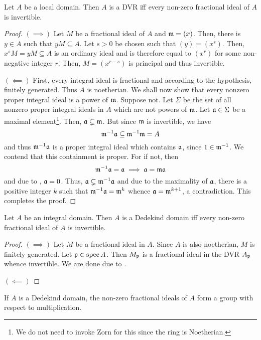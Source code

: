 \begin{proposition}
    Let $A$ be a local domain. Then $A$ is a DVR iff every non-zero fractional ideal of $A$ is invertible.
\end{proposition}
\begin{proof}
    $(\implies)$ Let $M$ be a fractional ideal of $A$ and $\mathfrak m = (x)$. Then, there is $y\in A$ such that $yM\subseteq A$. Let $s > 0$ be chosen such that $(y) = (x^s)$. Then, $x^sM = yM\subseteq A$ is an ordinary ideal and is therefore equal to $(x^r)$ for some non-negative integer $r$. Then, $M = (x^{r - s})$ is principal and thus invertible. 

    $(\impliedby)$ First, every integral ideal is fractional and according to the hypothesis, finitely generated. Thus $A$ is noetherian. We shall now show that every nonzero proper integral ideal is a power of $\mathfrak m$. Suppose not. Let $\Sigma$ be the set of all nonzero proper integral ideals in $A$ which are not powers of $\mathfrak m$. Let $\mathfrak a\in\Sigma$ be a maximal element\footnote{We do not need to invoke Zorn for this since the ring is Noetherian.}. Then, $\mathfrak a\subsetneq\mathfrak m$. But since $\mathfrak m$ is invertible, we have 
    \begin{equation*}
        \mathfrak m^{-1}\mathfrak a\subseteq\mathfrak m^{-1}\mathfrak m = A
    \end{equation*}
    and thus $\mathfrak m^{-1}\mathfrak a$ is a proper integral ideal which contains $\mathfrak a$, since $1\in\mathfrak m^{-1}$. We contend that this containment is proper. For if not, then 
    \begin{equation*}
        \mathfrak m^{-1}\mathfrak a = \mathfrak a\implies\mathfrak a = \mathfrak m\mathfrak a
    \end{equation*}
    and due to , $\mathfrak a = 0$. Thus, $\mathfrak a\subsetneq\mathfrak m^{-1}\mathfrak a$ and due to the maximality of $\mathfrak a$, there is a positive integer $k$ such that $\mathfrak m^{-1}\mathfrak a = \mathfrak m^k$ whence $\mathfrak a = \mathfrak m^{k + 1}$, a contradiction. This completes the proof.
\end{proof}

\begin{proposition}
    Let $A$ be an integral domain. Then $A$ is a Dedekind domain iff every non-zero fractional ideal of $A$ is invertible.
\end{proposition}
\begin{proof}
    $(\implies)$ Let $M$ be a fractional ideal in $A$. Since $A$ is also noetherian, $M$ is finitely generated. Let $\mathfrak p\in\operatorname{spec} A$. Then $M_\mathfrak p$ is a fractional ideal in the DVR $A_\mathfrak p$ whence invertible. We are done due to .

    $(\impliedby)$ 
\end{proof}

\begin{corollary}
    If $A$ is a Dedekind domain, the non-zero fractional ideals of $A$ form a group with respect to multiplication.
\end{corollary}